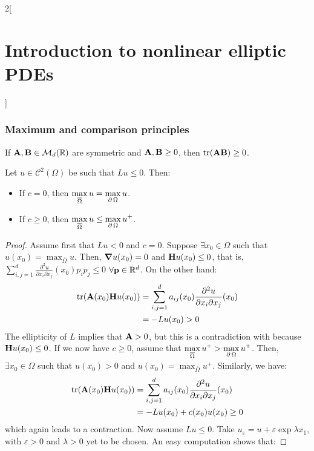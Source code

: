 \documentclass[../../../main_math.tex]{subfiles}
\begin{document}
\begin{multicols}{2}[\section{Introduction to nonlinear elliptic PDEs}]
  \subsubsection{Maximum and comparison principles}
  \begin{lemma}\label{INEPDE:lemma_matrices_max_principle}
    If $\boldsymbol{\mathrm{A}},\boldsymbol{\mathrm{B}}\in \mathcal{M}_d(\mathbb{R})$ are symmetric and $\boldsymbol{\mathrm{A}}, \boldsymbol{\mathrm{B}}\geq 0$, then $\tr(\boldsymbol{\mathrm{A}}\boldsymbol{\mathrm{B}})\geq 0$.
  \end{lemma}
  \begin{theorem}\label{INEPDE:weak_max_principle_nondiv}
    Let $u\in \mathcal{C}^2(\Omega)$ be such that $Lu\leq 0$. Then:
    \begin{itemize}
      \item If $c=0$, then $\displaystyle \max_{\overline{\Omega}}u=\max_{\operatorname{\partial}{\Omega}}u$.
      \item If $c\geq 0$, then $\displaystyle \max_{\overline{\Omega}}u\leq \max_{\operatorname{\partial}{\Omega}}u^+$.
    \end{itemize}
  \end{theorem}
  \begin{proof}
    Assume first that $Lu<0$ and $c=0$. Suppose $\exists x_0\in \Omega$ such that $u(x_0)=\max_{\overline{\Omega}}u$. Then, $\grad u(x_0)=0$ and $\boldsymbol{\mathrm{H}}u(x_0)\leq0$, that is, $\sum_{i,j=1}^d\frac{\partial^2u}{\partial x_i\partial x_j}(x_0)p_ip_j\leq 0$ $\forall \boldsymbol{\mathrm{p}}\in\mathbb{R}^d$. On the other hand:
    \begin{align*}
      \trace(\vf{A}(x_0)\vf{H}u(x_0)) & = \sum_{i,j=1}^d a_{ij}(x_0)\frac{\partial^2u}{\partial x_i\partial x_j}(x_0) \\
                                      & =-Lu(x_0)>0
    \end{align*}
    The ellipticity of $L$ implies that $\boldsymbol{\mathrm{A}}>0$, but this is a contradiction with  because $\boldsymbol{\mathrm{H}}u(x_0)\leq 0$. If we now have $c\geq 0$, assume that $\displaystyle \max_{\overline{\Omega}}u^+> \max_{\operatorname{\partial}{\Omega}}u^+$. Then, $\exists x_0\in \Omega$ such that $u(x_0)>0$ and $u(x_0)=\max_{\overline{\Omega}}u^+$. Similarly, we have:
    \begin{align*}
      \trace(\vf{A}(x_0)\vf{H}u(x_0)) & = \sum_{i,j=1}^d a_{ij}(x_0)\frac{\partial^2u}{\partial x_i\partial x_j}(x_0) \\
                                      & =-Lu(x_0) + c(x_0)u(x_0)\geq 0
    \end{align*}
    which again leads to a contraction. Now assume $Lu\leq 0$. Take $u_\varepsilon=u+\varepsilon \exp{\lambda x_1}$, with $\varepsilon>0$ and $\lambda>0$ yet to be chosen. An easy computation shows that:

\end{proof}
\end{multicols}
\end{document}
